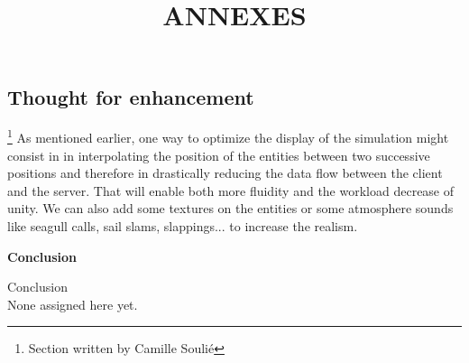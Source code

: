 \documentclass[a4paper]{report}
\begin{document}
\subsection{Thought for enhancement}
\footnote{Section written by Camille Soulié}
As mentioned earlier, one way to optimize the display of the simulation might consist in in interpolating the position of the entities between two successive positions and therefore in drastically reducing the data flow between the client and the server. That will enable both more fluidity and the workload decrease of unity.
We can also add some textures on the entities or some atmosphere sounds like seagull calls, sail slams, slappings... to increase the realism.

\newpage

	\begin{center}
		\textbf{\LARGE{Conclusion}}
	\end{center}

\vspace{5cm}

Conclusion
\\
None assigned here yet.

\newpage
\nocite{*}






\newpage

	\begin{center}
		\title{ \HRule{} \\ [12cm]
				\LARGE \textbf{\uppercase{Annexes}}\\ [12cm]
				\HRule{}}
		\maketitle
	\end{center}
\end{document}
